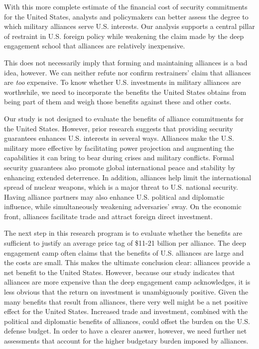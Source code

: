 With this more complete estimate of the financial cost of security commitments for the United States, analysts and policymakers can better assess the degree to which military alliances serve U.S. interests. Our analysis supports a central pillar of restraint in U.S. foreign policy while weakening the claim made by the deep engagement school that alliances are relatively inexpensive. 

This does not necessarily imply that forming and maintaining alliances is a bad idea, however. We can neither refute nor confirm restrainers' claim that alliances are \textit{too} expensive. To know whether U.S. investments in military alliances are worthwhile, we need to incorporate the benefits the United States obtains from being part of them and weigh those benefits against these and other costs. 
 
Our study is not designed to evaluate the benefits of alliance commitments for the United States. However, prior research suggests that providing security guarantees enhances U.S. interests in several ways. Alliances make the U.S. military more effective by facilitating power projection and augmenting the capabilities it can bring to bear during crises and military conflicts.\autocite[22-25]{BrandsFeaver2017} Formal security guarantees also promote global international peace and stability by enhancing extended deterrence.\autocite{leedsAJPS03,JohnsonLeeds2011,FuhrmannSechser2014} In addition, alliances help limit the international spread of nuclear weapons, which is a major threat to U.S. national security.\autocite{bleekJCR14,reiterFPA14} Having alliance partners may also enhance U.S. political and diplomatic influence, while simultaneously weakening adversaries' sway.\autocite{Morrow1991} On the economic front, alliances facilitate trade and attract foreign direct investment.\autocite{Gowa:1993aa,liJIBS10,rapphoopershields20}

The next step in this research program is to evaluate whether the benefits are sufficient to justify an average price tag of \$11-21 billion per alliance. The deep engagement camp often claims that the benefits of U.S. alliances are large and the costs are small. This makes the ultimate conclusion clear: alliances provide a net benefit to the United States. However, because our study indicates that alliances are more expensive than the deep engagement camp acknowledges, it is less obvious that the return on investment is unambiguously positive. Given the many benefits that result from alliances, there very well might be a net positive effect for the United States. Increased trade and investment, combined with the political and diplomatic benefits of alliances, could offset the burden on the U.S. defense budget. In order to have a clearer answer, however, we need further net assessments that account for the higher budgetary burden imposed by alliances.

